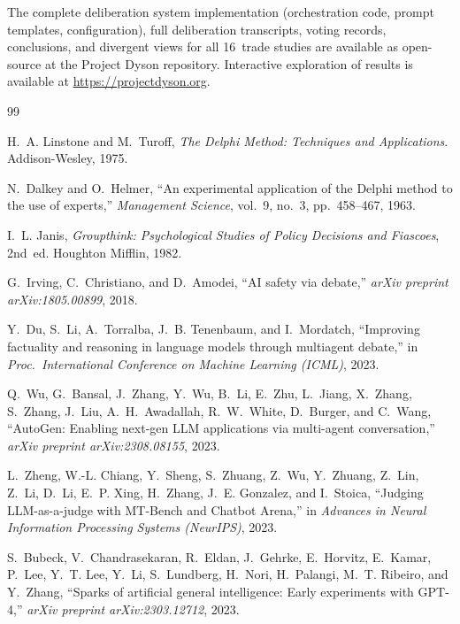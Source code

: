 \documentclass[11pt,a4paper]{article}
\begin{document}
The complete deliberation system implementation (orchestration code, prompt templates, configuration), full deliberation transcripts, voting records, conclusions, and divergent views for all 16~trade studies are available as open-source at the Project Dyson repository. Interactive exploration of results is available at \url{https://projectdyson.org}.

\begin{thebibliography}{99}

H.~A. Linstone and M.~Turoff, \emph{The Delphi Method: Techniques and Applications}. Addison-Wesley, 1975.

N.~Dalkey and O.~Helmer, ``An experimental application of the Delphi method to the use of experts,'' \emph{Management Science}, vol.~9, no.~3, pp.~458--467, 1963.

I.~L. Janis, \emph{Groupthink: Psychological Studies of Policy Decisions and Fiascoes}, 2nd~ed. Houghton Mifflin, 1982.

G.~Irving, C.~Christiano, and D.~Amodei, ``AI safety via debate,'' \emph{arXiv preprint arXiv:1805.00899}, 2018.

Y.~Du, S.~Li, A.~Torralba, J.~B. Tenenbaum, and I.~Mordatch, ``Improving factuality and reasoning in language models through multiagent debate,'' in \emph{Proc.\ International Conference on Machine Learning (ICML)}, 2023.

Q.~Wu, G.~Bansal, J.~Zhang, Y.~Wu, B.~Li, E.~Zhu, L.~Jiang, X.~Zhang, S.~Zhang, J.~Liu, A.~H.~Awadallah, R.~W.~White, D.~Burger, and C.~Wang, ``AutoGen: Enabling next-gen LLM applications via multi-agent conversation,'' \emph{arXiv preprint arXiv:2308.08155}, 2023.

L.~Zheng, W.-L. Chiang, Y.~Sheng, S.~Zhuang, Z.~Wu, Y.~Zhuang, Z.~Lin, Z.~Li, D.~Li, E.~P. Xing, H.~Zhang, J.~E. Gonzalez, and I.~Stoica, ``Judging LLM-as-a-judge with MT-Bench and Chatbot Arena,'' in \emph{Advances in Neural Information Processing Systems (NeurIPS)}, 2023.

S.~Bubeck, V.~Chandrasekaran, R.~Eldan, J.~Gehrke, E.~Horvitz, E.~Kamar, P.~Lee, Y.~T. Lee, Y.~Li, S.~Lundberg, H.~Nori, H.~Palangi, M.~T. Ribeiro, and Y.~Zhang, ``Sparks of artificial general intelligence: Early experiments with GPT-4,'' \emph{arXiv preprint arXiv:2303.12712}, 2023.


\end{thebibliography}
\end{document}
